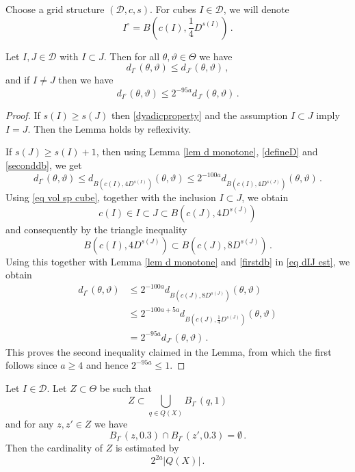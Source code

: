 Choose a grid structure $(\mathcal{D}, c, s)$. For cubes $I \in \mathcal{D}$, we will denote
$$
    I^\circ = B(c(I), \frac{1}{4} D^{s(I)})\,.
$$

\begin{lemma}
    \label{lem cube monotone}
    Let $I, J \in \mathcal{D}$ with $I \subset J$.
    Then for all $\theta, \vartheta \in\Theta$ we have
    $$
        d_{I^\circ}(\theta, \vartheta) \le d_{J^\circ}(\theta, \vartheta)\,,
    $$
    and if $I \ne J$ then we have
    $$
        d_{I^\circ}(\theta, \vartheta) \le 2^{-95a} d_{J^\circ}(\theta, \vartheta)\,.
    $$
\end{lemma}

\begin{proof}
    If $s(I) \ge s(J)$ then \eqref{dyadicproperty} and the assumption $I\subset J$ imply $I = J$. Then the Lemma holds by reflexivity.

    If $s(J) \ge s(I)+1$, then using Lemma \ref{lem d monotone}, \eqref{defineD} and \eqref{seconddb}, we get
    \begin{equation}
    \label{eq dIJ est}
        d_{I^\circ}(\theta, \vartheta) \le d_{B(c(I), 4 D^{s(I)})}(\theta, \vartheta) \le 2^{-100a} d_{B(c(I), 4D^{s(J)})}(\theta, \vartheta)\,.
    \end{equation}
    Using \eqref{eq vol sp cube}, together with the inclusion $I \subset J$, we obtain
    $$
        c(I) \in I \subset J \subset B(c(J), 4 D^{s(J)})
    $$
    and consequently by the triangle inequality
    $$
        B(c(I), 4 D^{s(J)}) \subset B(c(J), 8 D^{s(J)})\,.
    $$
    Using this together with Lemma \ref{lem d monotone} and \eqref{firstdb} in \eqref{eq dIJ est}, we obtain
    \begin{align*}
        d_{I^\circ}(\theta, \vartheta) &\le 2^{-100a} d_{B(c(J), 8D^{s(J)})}(\theta, \vartheta)\\
        &\le 2^{-100a + 5a} d_{B(c(J), \frac{1}{4}D^{s(J)})}(\theta, \vartheta)\\
        &= 2^{-95a}d_{J^\circ}(\theta, \vartheta)\,.
    \end{align*}
    This proves the second inequality claimed in the Lemma, from which the first follows since $a \ge 4$ and hence $2^{-95a} \le 1$.
\end{proof}

\begin{lemma}
    \label{lem tile center 1}
    Let $I \in \mathcal{D}$. Let $Z \subset \Theta$ be such that
    \begin{equation}
        \label{eq tile Z}
        Z \subset \bigcup_{q \in Q(X)} B_{I^\circ}(q, 1)
    \end{equation}
    and for any $z, z' \in Z$ we have
    \begin{equation}
        \label{eq tile disjoint Z}
        B_{I^\circ}(z, 0.3) \cap B_{I^\circ}(z', 0.3) = \emptyset\,.
    \end{equation}
    Then the cardinality of $Z$ is estimated by
    $$
        2^{2a}|Q(X)|\,.
    $$
\end{lemma}

